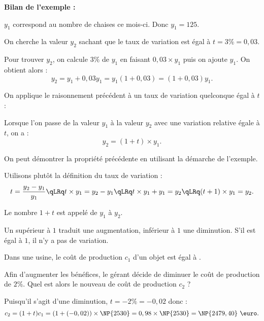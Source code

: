 \documentclass[10pt,openright,twoside,french]{book}
\begin{document}
\begin{Rmq}
    \textbf{Bilan de l'exemple :}\par
    $y_1$ correspond au nombre de chaises ce mois-ci. Donc $y_1 = 125$.\par
    On cherche la valeur $y_2$ sachant que le taux de variation est égal à $t = 3\% = 0,03$.\par\medskip
    Pour trouver $y_2$, on calcule $3\%$ de $y_1$ en faisant $0,03 \times y_1$ puis on ajoute $y_1$. On obtient alors :
    \[y_2 = y_1 + 0,03y_1 = y_1(1 + 0,03) = (1 + 0,03)y_1.\]
\end{Rmq}\clearpage

On applique le raisonnement précédent à un taux de variation quelconque égal à $t$ :\medskip

\begin{Prop}
    Lorsque l'on passe de la valeur $y_1$ à la valeur $y_2$ avec une variation relative égale à $t$, on a :
    \[y_2 = (1 + t) \times y_1.\]
\end{Prop}

\begin{Demo}
    On peut démontrer la propriété précédente en utilisant la démarche de l'exemple.\par
    Utilisons plutôt la définition du taux de variation :
    \[t = \frac{y_2 - y_1}{y_1} \qLRq t \times y_1 = y_2 - y_1 \qLRq t \times y_1 + y_1 = y_2 \qLRq (t + 1)\times y_1 = y_2.\]
\end{Demo}

\begin{Defi}
    Le nombre $1 + t$ est appelé  de $y_1$ à $y_2$.\par
    Un \coef supérieur à $1$ traduit une augmentation, inférieur à $1$ une diminution. S'il est égal à $1$, il n'y a pas de variation.
\end{Defi}

\begin{Exemple}
    Dans une usine, le coût de production $c_1$ d'un objet est égal à .\par
    Afin d'augmenter les bénéfices, le gérant décide de diminuer le coût de production de $2\%$. Quel est alors le nouveau de coût de production $c_2$ ?\medskip

    Puisqu'il s'agit d'une diminution, $t = -2\% = -0,02$ donc :
    \[c_2 = (1+t)c_1 = (1 + (-0,02)) \times \NP{2530} = 0,98 \times \NP{2530} = \NP{2479,40} \text{ \euro}.\]
\end{Exemple}
\end{document}
